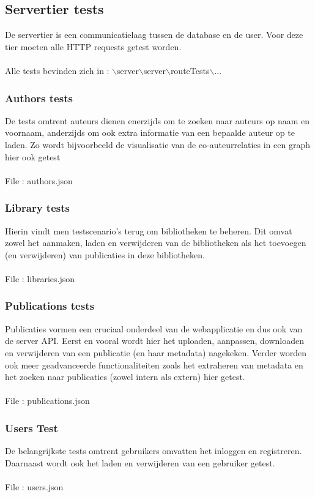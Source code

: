\documentclass{article}
\begin{document}
\subsection{Servertier tests}
De servertier is een communicatielaag tussen de database en de user. Voor deze tier moeten alle HTTP requests getest worden.
\\\\
Alle tests bevinden zich in : $\backslash$server$\backslash$server$\backslash$routeTests$\backslash$...
\subsubsection{Authors tests}
De tests omtrent auteurs dienen enerzijds om te zoeken naar auteurs op naam en voornaam, anderzijds om ook extra informatie van een bepaalde auteur op te laden. Zo wordt bijvoorbeeld de visualisatie van de co-auteurrelaties in een graph hier ook getest\\\\
File : authors.json
\subsubsection{Library tests}
Hierin vindt men testscenario's terug om bibliotheken te beheren. Dit omvat zowel het aanmaken, laden en verwijderen van de bibliotheken als het toevoegen (en verwijderen) van publicaties in deze bibliotheken.\\\\
File : libraries.json
\subsubsection{Publications tests}
Publicaties vormen een cruciaal onderdeel van de webapplicatie en dus ook van de server API. Eerst en vooral wordt hier het uploaden, aanpassen, downloaden en verwijderen van een publicatie (en haar metadata) nagekeken. Verder worden ook meer geadvanceerde functionaliteiten zoals het extraheren van metadata en het zoeken naar publicaties (zowel intern als extern) hier getest.\\\\
File : publications.json
\subsubsection{Users Test}
De belangrijkste tests omtrent gebruikers omvatten het inloggen en registreren.
Daarnaast wordt ook het laden en verwijderen van een gebruiker getest.\\\\
File : users.json
\end{document}
